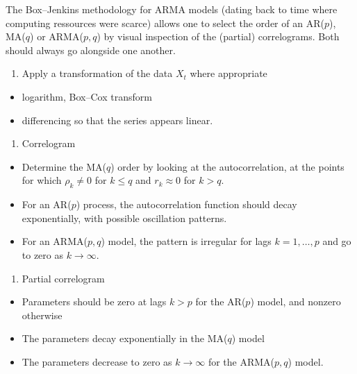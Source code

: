 \documentclass[]{book}
\providecommand{\tightlist}{%
  \setlength{\itemsep}{0pt}\setlength{\parskip}{0pt}}
\begin{document}
The Box--Jenkins methodology for ARMA models (dating back to time where
computing ressources were scarce) allows one to select the order of an
AR(\(p\)), MA(\(q\)) or ARMA(\(p, q\)) by visual inspection of the
(partial) correlograms. Both should always go alongside one another.

\begin{enumerate}
\def\labelenumi{\arabic{enumi}.}
\tightlist
\item
  Apply a transformation of the data \(X_t\) where appropriate
\end{enumerate}

\begin{itemize}
\tightlist
\item
  logarithm, Box--Cox transform
\item
  differencing so that the series appears linear.
\end{itemize}

\begin{enumerate}
\def\labelenumi{\arabic{enumi}.}
\setcounter{enumi}{1}
\tightlist
\item
  Correlogram
\end{enumerate}

\begin{itemize}
\tightlist
\item
  Determine the MA(\(q\)) order by looking at the autocorrelation, at
  the points for which \(\rho_k \neq 0\) for \(k \leq q\) and
  \(r_k \approx 0\) for \(k>q\).
\item
  For an AR(\(p\)) process, the autocorrelation function should decay
  exponentially, with possible oscillation patterns.
\item
  For an ARMA(\(p, q\)) model, the pattern is irregular for lags
  \(k = 1, \ldots, p\) and go to zero as \(k \to \infty\).
\end{itemize}

\begin{enumerate}
\def\labelenumi{\arabic{enumi}.}
\setcounter{enumi}{2}
\tightlist
\item
  Partial correlogram
\end{enumerate}

\begin{itemize}
\tightlist
\item
  Parameters should be zero at lags \(k>p\) for the AR(\(p\)) model, and
  nonzero otherwise
\item
  The parameters decay exponentially in the MA(\(q\)) model
\item
  The parameters decrease to zero as \(k \to \infty\) for the
  ARMA(\(p, q\)) model.
\end{itemize}
\end{document}
